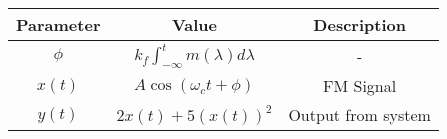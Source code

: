 \begin{tabular}{|c|c|c|}
    \hline
     \textbf{Parameter} & \textbf{Value} &
     \textbf{Description}\\
    \hline 
     $\phi$ &  $k_f \int_{-\infty}^{t} m(\lambda) d\lambda$ & -\\
    \hline 
     $x(t)$ &  $A \cos(\omega_c t + \phi)$ & FM Signal\\
     
    \hline
     $y(t)$ & $2x(t) + 5(x(t))^2 $ & Output from system  \\
      \hline
      
    
  
								      
\end{tabular}